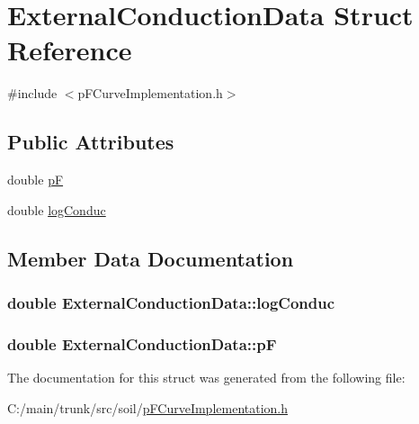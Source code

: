 \hypertarget{struct_external_conduction_data}{
\section{ExternalConductionData Struct Reference}
\label{struct_external_conduction_data}
}


{\ttfamily \#include $<$pFCurveImplementation.h$>$}\subsection*{Public Attributes}
\begin{DoxyCompactItemize}
\item 
double \hyperlink{struct_external_conduction_data_a2131591156d8cc3cbe2ca5f7a8338ef0}{pF}
\item 
double \hyperlink{struct_external_conduction_data_ad6e61182c591db069abe8d6bdc5b52c9}{logConduc}
\end{DoxyCompactItemize}


\subsection{Member Data Documentation}
\hypertarget{struct_external_conduction_data_ad6e61182c591db069abe8d6bdc5b52c9}{
\subsubsection[{logConduc}]{\setlength{\rightskip}{0pt plus 5cm}double {\bf ExternalConductionData::logConduc}}}
\label{struct_external_conduction_data_ad6e61182c591db069abe8d6bdc5b52c9}
\hypertarget{struct_external_conduction_data_a2131591156d8cc3cbe2ca5f7a8338ef0}{
\subsubsection[{pF}]{\setlength{\rightskip}{0pt plus 5cm}double {\bf ExternalConductionData::pF}}}
\label{struct_external_conduction_data_a2131591156d8cc3cbe2ca5f7a8338ef0}


The documentation for this struct was generated from the following file:\begin{DoxyCompactItemize}
\item 
C:/main/trunk/src/soil/\hyperlink{p_f_curve_implementation_8h}{pFCurveImplementation.h}\end{DoxyCompactItemize}
